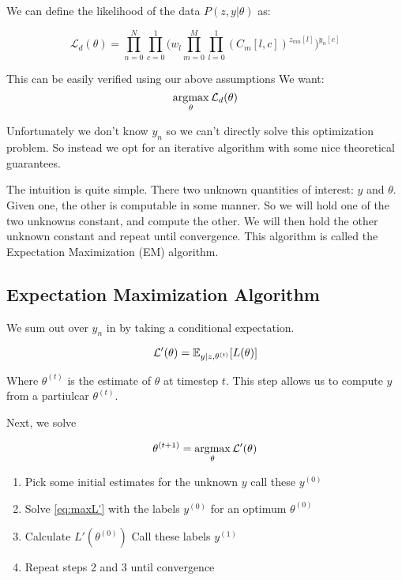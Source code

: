 We can define the likelihood of the data $P(z,y| \theta)$ as:

\begin{equation}  \label{eq:L}
\mathcal{L}_{d}(\theta) =
\displaystyle\prod\limits_{n=0}^{N} \displaystyle\prod\limits_{c=0}^{1}
\Big (w_{l} \displaystyle\prod\limits_{m=0}^{M} \displaystyle\prod\limits_{l=0}^{1} (C_{m}[l,c])^{z_{mn}[l]} \Big )^{y_{n}[c]}
\end{equation}

This can be easily verified using our above assumptions
We want: \\

\begin{equation} \label{eq:maxL}
\operatorname*{arg\!\max}_{\theta} \mathcal{L}_{d}(\theta)
\end{equation}

Unfortunately we don't know $y_{n}$ so we can't directly solve this optimization problem.
So instead we opt for an iterative algorithm with some nice theoretical guarantees.

The intuition is quite simple. There two unknown quantities of interest: $y$
and $\theta$.  Given one, the other is computable in some manner. So we will
hold one of the two unknowns constant, and compute the other. We will then hold
the other unknown constant and repeat until convergence. This algorithm is
called the Expectation Maximization (EM) algorithm.

\subsection{Expectation Maximization Algorithm}

We sum out over $y_{n}$ in \label{eq:L} by taking a
conditional expectation.

\begin{equation} \label{eq:L'}
    \mathcal{L'}(\theta) = \mathbb{E}_{y | z, \theta^{(t)}}[L(\theta)]
\end{equation}

Where $\theta^{(t)}$ is the estimate of $\theta$ at timestep $t$. This step
allows us to compute $y$ from a partiulcar $\theta^{(t)}$.

Next, we solve

\begin{equation} \label{eq:maxL'}
    \theta^{(t+1)} = \operatorname*{arg\!\max}_{\theta} \mathcal{L'}(\theta)
\end{equation}

\begin{enumerate}
    \item Pick some initial estimates for the unknown $y$ call these $y^{(0)}$
    \item Solve \eqref{eq:maxL'} with the labels $y^{(0)}$ for an optimum $\theta^{(0)}$
    \item Calculate $L'(\theta^{(0)})$ Call these labels $y^{(1)}$
    \item Repeat steps 2 and 3 until convergence
\end{enumerate}

